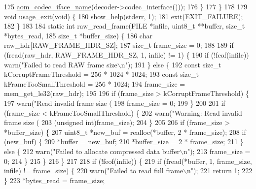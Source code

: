 \begin{DoxyCodeInclude}
{{{{{175             \hyperlink{group__codec_ga013b1f6d96b2cf9489396311a7e5179b}{aom\_codec\_iface\_name}(decoder->codec\_interface()));
176   \}
177 \}
178 
179 \textcolor{keywordtype}{void} usage\_exit(\textcolor{keywordtype}{void}) \{
180   show\_help(stderr, 1);
181   exit(EXIT\_FAILURE);
182 \}
183 
184 \textcolor{keyword}{static} \textcolor{keywordtype}{int} raw\_read\_frame(FILE *infile, uint8\_t **buffer, \textcolor{keywordtype}{size\_t} *bytes\_read,
185                           \textcolor{keywordtype}{size\_t} *buffer\_size) \{
186   \textcolor{keywordtype}{char} raw\_hdr[RAW\_FRAME\_HDR\_SZ];
187   \textcolor{keywordtype}{size\_t} frame\_size = 0;
188 
189   \textcolor{keywordflow}{if} (fread(raw\_hdr, RAW\_FRAME\_HDR\_SZ, 1, infile) != 1) \{
190     \textcolor{keywordflow}{if} (!feof(infile)) warn(\textcolor{stringliteral}{"Failed to read RAW frame size\(\backslash\)n"});
191   \} \textcolor{keywordflow}{else} \{
192     \textcolor{keyword}{const} \textcolor{keywordtype}{size\_t} kCorruptFrameThreshold = 256 * 1024 * 1024;
193     \textcolor{keyword}{const} \textcolor{keywordtype}{size\_t} kFrameTooSmallThreshold = 256 * 1024;
194     frame\_size = mem\_get\_le32(raw\_hdr);
195 
196     \textcolor{keywordflow}{if} (frame\_size > kCorruptFrameThreshold) \{
197       warn(\textcolor{stringliteral}{"Read invalid frame size (%
198       frame\_size = 0;
199     \}
200 
201     \textcolor{keywordflow}{if} (frame\_size < kFrameTooSmallThreshold) \{
202       warn(\textcolor{stringliteral}{"Warning: Read invalid frame size (%
203            (\textcolor{keywordtype}{unsigned} \textcolor{keywordtype}{int})frame\_size);
204     \}
205 
206     \textcolor{keywordflow}{if} (frame\_size > *buffer\_size) \{
207       uint8\_t *new\_buf = realloc(*buffer, 2 * frame\_size);
208       \textcolor{keywordflow}{if} (new\_buf) \{
209         *buffer = new\_buf;
210         *buffer\_size = 2 * frame\_size;
211       \} \textcolor{keywordflow}{else} \{
212         warn(\textcolor{stringliteral}{"Failed to allocate compressed data buffer\(\backslash\)n"});
213         frame\_size = 0;
214       \}
215     \}
216   \}
217 
218   \textcolor{keywordflow}{if} (!feof(infile)) \{
219     \textcolor{keywordflow}{if} (fread(*buffer, 1, frame\_size, infile) != frame\_size) \{
220       warn(\textcolor{stringliteral}{"Failed to read full frame\(\backslash\)n"});
221       \textcolor{keywordflow}{return} 1;
222     \}
223     *bytes\_read = frame\_size;
}}}}}}}
\end{DoxyCodeInclude}
